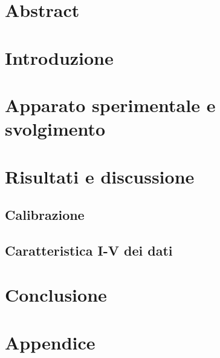 \documentclass[12pt]{article}
\begin{document}


\section*{Abstract}


\section{Introduzione}


\section{Apparato sperimentale e svolgimento}


\section{Risultati e discussione}

\subsection{Calibrazione}


\subsection{Caratteristica I-V dei dati}


\section*{Conclusione}


\newpage
\section*{\Huge Appendice}
\appendix


\end{document}

